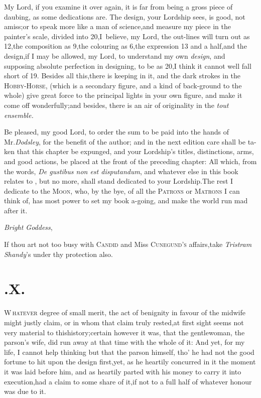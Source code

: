 \documentclass{article}
\begin{document}
My Lord, if you examine it over\break 
again, it is far from being a gross piece\break
of daubing, as some dedications are.\break
The design, your
Lordship sees, is good, 
not amiss;\tsk  or to speak more like a man of
science,\tsk  and measure my piece in the painter’s scale,
divided into 20,\tsk  I~believe, my Lord, the out-lines will turn
out as 12,\tsk  the composition as 9,\tsk  the colouring as
6,\tsk  the expression 13 and a half,\tsk  and the
design,\tsk  if I may be allowed, my Lord, to understand my own
\textit{design}, and supposing absolute perfection in designing, to
be as 20,\tsk  I think it cannot well fall short of 19. Besides
all this,\tsk  there is keeping in it, and the dark strokes in the
\textsc{Hobby-Horse}, (which is a secondary
figure, and a kind of back-ground to the whole) give great force to the
principal lights in your own figure, and make it come off
wonderfully;\tsk  and besides, there is an air of originality in
the \textit{tout ensemble.}

Be pleased, my good Lord, to order the sum to be paid into the
hands of Mr.\break\textit{Dodsley}, for the benefit of the author; and in
the next edition care shall be ta-\break ken that this chapter be expunged,
and your Lordship’s titles, distinctions, arms, and good
actions, be placed at the front of the preceding chapter: All
which, from the words, \textit{De gustibus non est disputandum}, and
whatever else in this book relates to
, but no more, shall
stand dedicated to your Lordship.\tsk\break  The rest I dedicate to the
\textsc{Moon}, who, by the bye, of all the \textsc{Patrons} or
\textsc{Matrons} I can think of, has most power to set my
book a-going, and make the world run mad after it.

\vskip-6pt

\textit{Bright Goddess},

\vskip-6pt

If thou art not too busy with \textsc{Candid} and Miss
\textsc{Cunegund’s} affairs,\tsk  take \textit{Tristram
Shandy}’s under thy protection also.

\vskip-6pt

\enlargethispage\baselineskip

\section{.\enspace X.}

\lettrine{W\,}{hatever} degree of small merit, the
act of benignity in favour of the midwife might justly claim, or in
whom that claim truly rested,\tsk  at first sight seems not very
material to this\break history;\tsh  certain however it was, that
the gentlewoman, the parson’s wife, did run away at that time
with the whole of it: And yet, for my life, I cannot help thinking
but that the parson himself, tho’ he had not the good fortune to
hit upon the design first,\tsk  yet, as he heartily concurred in
it the moment it was laid before him, and as heartily parted with\break
his money to carry it into execution,\break had a claim to some share of
it,\tsk  if not to a full half of whatever honour was due to
it.
\end{document}
